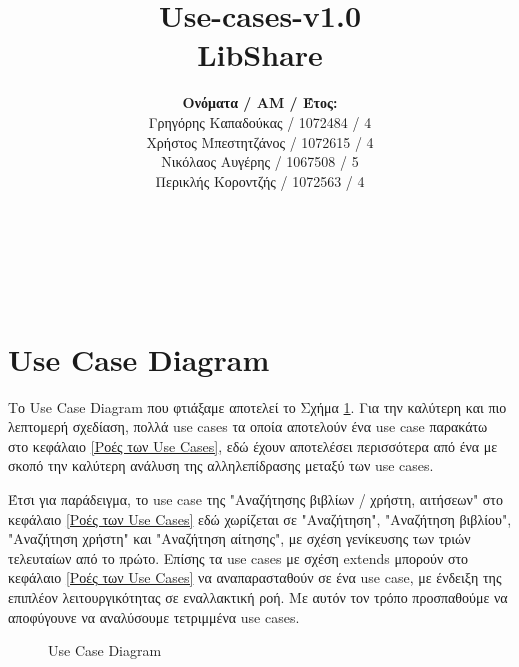\documentclass[12pt,a4paper]{article}
\title{Use-cases-v1.0 \\ LibShare}
\author{\textbf{Ονόματα / ΑΜ / Έτος:} \\ Γρηγόρης Καπαδούκας / 1072484 / 4\textdegree \\ Χρήστος Μπεστητζάνος / 1072615 / 4\textdegree \\ Νικόλαος Αυγέρης / 1067508 / 5\textdegree \\ Περικλής Κοροντζής / 1072563 / 4\textdegree}
\begin{document}
\makeatletter
\begin{center}
	\LARGE{\@title} \\
	\pagebreak
	\begin{LARGE}\@author\end{LARGE} \\
\end{center}
\pagebreak

\section{Use Case Diagram}

Το Use Case Diagram που φτιάξαμε αποτελεί το Σχήμα \ref{Use Case Diagram}. Για την καλύτερη και πιο λεπτομερή σχεδίαση, πολλά use cases τα οποία αποτελούν ένα use case παρακάτω στο κεφάλαιο \ref{Ροές των Use Cases}, εδώ έχουν αποτελέσει περισσότερα από ένα με σκοπό την καλύτερη ανάλυση της αλληλεπίδρασης μεταξύ των use cases.

Έτσι για παράδειγμα, το use case της "Αναζήτησης βιβλίων / χρήστη, αιτήσεων" στο κεφάλαιο \ref{Ροές των Use Cases} εδώ χωρίζεται σε "Αναζήτηση", "Αναζήτηση βιβλίου", "Αναζήτηση χρήστη" και "Αναζήτηση αίτησης", με σχέση γενίκευσης των τριών τελευταίων από το πρώτο. Επίσης τα use cases με σχέση extends μπορούν στο κεφάλαιο \ref{Ροές των Use Cases} να αναπαρασταθούν σε ένα use case, με ένδειξη της επιπλέον λειτουργικότητας σε εναλλακτική ροή. Με αυτόν τον τρόπο προσπαθούμε να αποφύγουνε να αναλύσουμε τετριμμένα use cases.

\begin{figure}[H]
	\caption{Use Case Diagram}
	\label{Use Case Diagram}
\end{figure}
\end{document}
